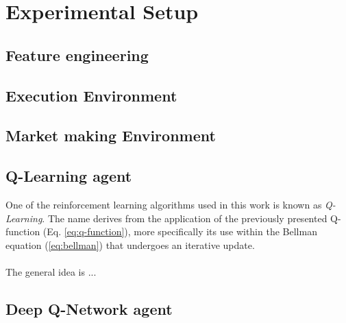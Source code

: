 \chapter{Experimental Setup}
\label{chap:setup}

\section{Feature engineering}

\section{Execution Environment}

\section{Market making Environment}

\section{Q-Learning agent}

One of the reinforcement learning algorithms used in this work is known as \textit{Q-Learning}. 
The name derives from the application of the previously presented Q-function (Eq. \ref{eq:q-function}), more specifically its use within the Bellman equation (\ref{eq:bellman}) that undergoes an iterative update.
\\
\\
The general idea is ... 

\section{Deep Q-Network agent}
